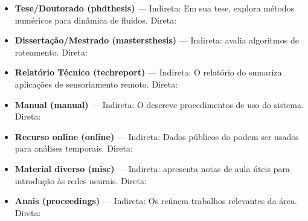 \begin{itemize}
    \item \textbf{Tese/Doutorado (phdthesis)} --- Indireta: Em sua tese, \textcite{phdthesis1} explora métodos numéricos para dinâmica de fluidos. Direta:\par

    \item \textbf{Dissertação/Mestrado (mastersthesis)} --- Indireta: \textcite{mastersthesis1} avalia algoritmos de roteamento. Direta:\par

    \item \textbf{Relatório Técnico (techreport)} --- Indireta: O relatório do \textcite{techreport1} sumariza aplicações de sensoriamento remoto. Direta:\par

    \item \textbf{Manual (manual)} --- Indireta: O \textcite{manual1} descreve procedimentos de uso do sistema. Direta:\par

    \item \textbf{Recurso online (online)} --- Indireta: Dados públicos do \textcite{online1} podem ser usados para análises temporais. Direta:\par

    \item \textbf{Material diverso (misc)} --- Indireta: \textcite{misc1} apresenta notas de aula úteis para introdução às redes neurais. Direta:\par

    \item \textbf{Anais (proceedings)} --- Indireta: Os \textcite{proceedings1} reúnem trabalhos relevantes da área. Direta:\par


\end{itemize}
